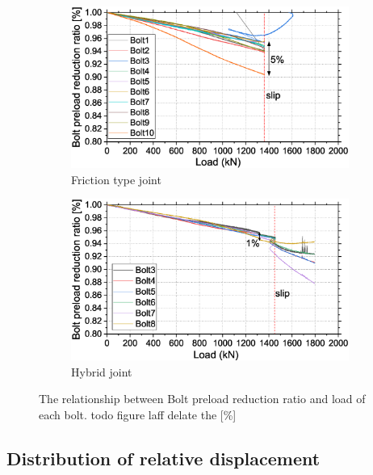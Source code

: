 \begin{figure}
    \centering
    \begin{subfigure}[t]{0.7\textwidth}
    \centering
    \includegraphics[width=\linewidth]{imgs/ch6/loadaf-fric.eps}
    \caption{Friction type joint }
    \label{fig-laff}
    \end{subfigure}
    \begin{subfigure}[t]{0.7\textwidth}
    \centering
    \includegraphics[width=\linewidth]{imgs/ch6/loadaf-hyb.eps}
    \caption{Hybrid joint }
    \label{fig-lafhy}
    \end{subfigure}
    \caption{The relationship between Bolt preload reduction ratio and load of each bolt. todo figure laff delate the [\%]}
    \label{fig-laf}
\end{figure}

\subsection{Distribution of relative displacement}

